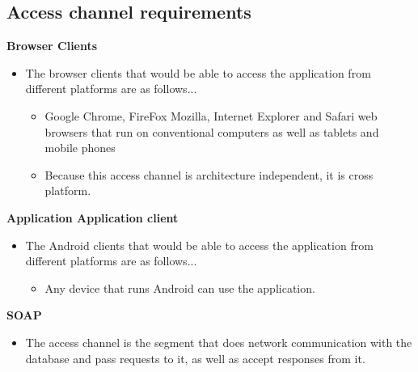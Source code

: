 \documentclass[10pt,a4paper]{article}
\begin{document}
\subsection{Access channel requirements}
\begin{center}\textbf{Browser Clients}\end{center}
	  \begin{itemize}
                                                \item The browser clients that would be able to access the application from different platforms are as follows...
                                                \begin{itemize}
                                                                \item Google Chrome, FireFox Mozilla, Internet Explorer and Safari web browsers that run on conventional computers as well as tablets and mobile phones

\item Because this access channel is architecture independent, it is cross platform.                                                               


                                                \end{itemize}
                                \end{itemize}
                                
\begin{center}\textbf{Application Application client}\end{center}
	  \begin{itemize}
                                                \item The Android clients that would be able to access the application from different platforms are as follows...
                                                \begin{itemize}
                                                                \item Any device that runs Android can use the application.
                                                               


                                                \end{itemize}
                                \end{itemize}                                
                                
\begin{center}\textbf{SOAP}\end{center}
	  \begin{itemize}
                                                \item The access channel is the segment that does network communication with the database and pass requests to it, as well as accept responses from it.
                                \end{itemize}                                                                
                                
\end{document}
